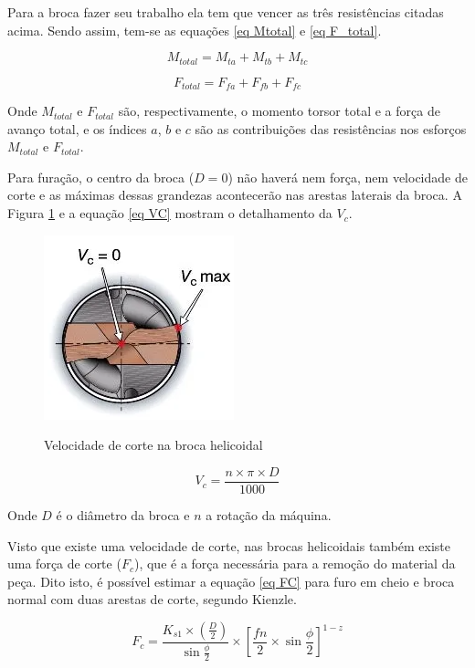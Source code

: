 \documentclass[deposito, acronym, symbols]{fei}
\begin{document}
Para a broca fazer seu trabalho ela tem que vencer as três resistências citadas acima. Sendo assim, tem-se as equações \ref{eq Mtotal} e \ref{eq F_total}.

\begin{equation}
    \label{eq Mtotal}
    M_{total}= M_{ta}+M_{tb}+M_{tc}
\end{equation}

\begin{equation}
    \label{eq F_total}
    F_{total}= F_{fa}+F_{fb}+F_{fc}
\end{equation}

Onde $M_{total}$ e $F_{total}$ são, respectivamente, o momento torsor total e a força de avanço total, e os índices $a$, $b$ e $c$ são as contribuições das resistências nos esforços $M_{total}$ e $F_{total}$.

Para furação, o centro da broca ($D=0$) não haverá nem força, nem velocidade de corte e as máximas dessas grandezas acontecerão nas arestas laterais da broca. A Figura \ref{fig:vc sandvik} e a equação \ref{eq VC} mostram o detalhamento da $V_c$. 

\begin{figure}[!htp]
    \centering
    \caption{Velocidade de corte na broca helicoidal}
    \includegraphics[width=0.3\linewidth]{Imagens/vc sandivik certo.png}
    \label{fig:vc sandvik}
\end{figure}

\begin{equation}
    \label{eq VC}
    V_c=\frac{{n}\times {\pi} \times{D}}{1000}
\end{equation}

Onde $D$ é o diâmetro da broca e $n$ a rotação da máquina.

Visto que existe uma velocidade de corte, nas brocas helicoidais também existe uma força de corte ($F_c$), que é a força necessária para a remoção do material da peça. Dito isto, é possível estimar a equação \ref{eq FC} para furo em cheio e broca normal com duas arestas de corte, segundo Kienzle. 

\begin{equation}
    \label{eq FC}
    F_c=\frac{K_{s1}\times{(\frac{D}{2})}}{\sin{\frac{\phi}{2}}}\times[{\frac{fn}{2}}\times{\sin{\frac{\phi}{2}}}]^{1-z}
\end{equation}
\end{document}

